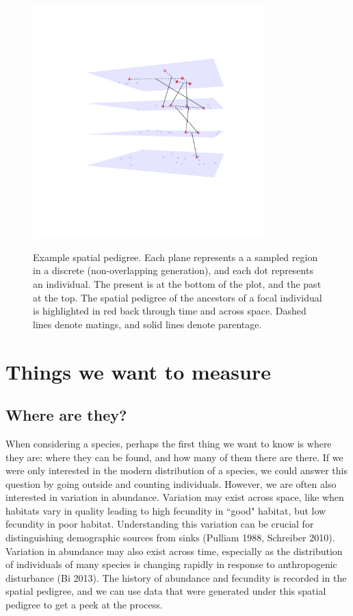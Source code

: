 \documentclass{ar-1col}
\begin{document}
\begin{figure}
	\centering
		{\includegraphics[width=0.8\textwidth]{figs/spatial_pedigree.pdf}}
		\caption{Example spatial pedigree.
		Each plane represents a a sampled region in a discrete (non-overlapping generation), 
		and each dot represents an individual.
		The present is at the bottom of the plot, and the past at the top.
		The spatial pedigree of the ancestors of a focal individual is highlighted in red
		back through time and across space.
		Dashed lines denote matings, and solid lines denote parentage.
			    }\label{spatial_pedigree}
\end{figure}


\section{Things we want to measure}
\subsection{Where are they?}
When considering a species, 
perhaps the first thing we want to know is where they are: 
where they can be found, and how many of them there are there.
If we were only interested in the modern distribution of a species, 
we could answer this question by going outside and counting individuals.
However, we are often also interested in variation in abundance.
Variation may exist across space,
like when habitats vary in quality
leading to high fecundity in ``good" habitat, 
but low fecundity in poor habitat.
Understanding this variation can be crucial for 
distinguishing demographic sources from sinks (Pulliam 1988, Schreiber 2010).
Variation in abundance may also exist across time,
especially as the distribution of individuals of many species is changing rapidly 
in response to anthropogenic disturbance (Bi 2013).
The history of abundance and fecundity is recorded in the spatial pedigree, 
and we can use data that were generated under this spatial pedigree 
to get a peek at the process.
\end{document}
